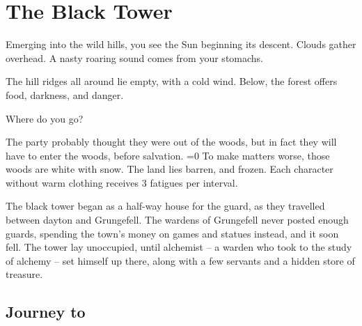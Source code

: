 \chapter{The Black Tower}
\epigraph{
  Emerging into the wild hills, you see the Sun beginning its descent.
  Clouds gather overhead.
  A nasty roaring sound comes from your stomachs.

  The hill ridges all around lie empty, with a cold wind.
  Below, the forest offers food, darkness, and danger.

  Where do you go?
}{}

\begin{multicols}{2}

\noindent
The party probably thought they were out of the woods, but in fact they will have to enter the woods, before salvation.
\ifnum\value{temperature}=0
  To make matters worse, those woods are white with snow.
  The land lies barren, and frozen.
  Each character without warm clothing receives 3 \glspl{fatigue} per \gls{interval}.
\fi

\begin{exampletext}
  The black tower began as a half-way house for the \gls{guard}, as they travelled between \gls{dayton} and Grungefell.
  The wardens of Grungefell never posted enough guards, spending the town's money on games and statues instead, and it soon fell.
  The tower lay unoccupied, until \gls{alchemist} -- a warden who took to the study of alchemy -- set himself up there, along with a few servants and a hidden store of treasure.
\end{exampletext}

\end{multicols}

\section{Journey to }

